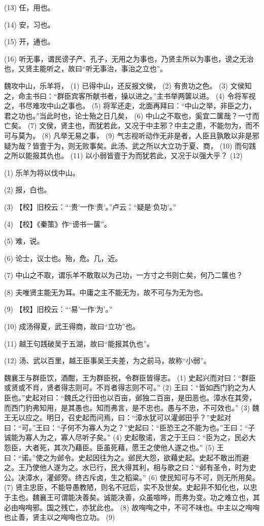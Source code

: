 \documentclass[12pt,UTF8]{ctexbook}
\begin{document}
(13) 任，用也。

(14) 安，习也。

(15) 开，通也。

(16) 听无事，谓民谤子产、孔子，无用之为事也，乃贤主所以为事也，谤之无治也，又贤主能听之，故曰“听无事治，事治之立也”。

魏攻中山，乐羊将， (1) 已得中山，还反报文侯， (2) 有贵功之色。 (3) 文侯知之，命主书曰：“群臣宾客所献书者，操以进之。”主书举两箧以进。 (4) 令将军视之，书尽难攻中山之事也。 (5) 将军还走，北面再拜曰：“中山之举，非臣之力，君之功也。”当此时也，论士殆之日几矣， (6) 中山之不取也，奚宜二箧哉？一寸而亡矣。 (7) 文侯，贤主也，而犹若此，又况于中主邪？中主之患，不能勿为，而不可与莫为。 (8) 凡举无易之事， (9) 气志视听动作无非是者，人臣且孰敢以非是邪疑为哉？皆壹于为，则无败事矣。此汤、武之所以大立功于夏、商， (10) 而句践之所以能报其仇也。 (11) 以小弱皆壹于为而犹若此，又况于以强大乎？ (12)

(1) 乐羊为将以伐中山。

(2) 报，白也。

(3) 【校】旧校云：“‘贵’一作‘责’。”卢云：“疑是‘负功’。”

(4) 【校】《秦策》作“谤书一箧”。

(5) 难，说。

(6) 论士，议士也。殆，危。几，近。

(7) 中山之不取，谓乐羊不敢取以为己功，一方寸之书则亡矣，何乃二箧也？

(8) 夫唯贤主能无为耳。中庸之主不能无为，故不可与为无为也。

(9) 【校】旧校云：“‘易’一作‘为’。”

(10) 成汤得夏，武王得商，故曰“立功”也。

(11) 越王句践破吴于五湖，故曰“能报其仇也”。

(12) 汤、武以百里，越王臣事吴王夫差，为之前马，故称“小弱”。

魏襄王与群臣饮，酒酣，王为群臣祝，令群臣皆得志。 (1) 史起兴而对曰：“群臣或贤或不肖，贤者得志则可。不肖者得志则不可。” (2) 王曰：“皆如西门豹之为人臣也。”史起对曰：“魏氏之行田也以百亩，邺独二百亩，是田恶也。漳水在其旁，而西门豹弗知用，是其愚也。知而弗言，是不忠也。愚与不忠，不可效也。” (3) 魏王无以应之。明日，召史起而问焉，曰：“漳水犹可以灌邺田乎？”史起对曰：“可。”王曰：“子何不为寡人为之？”史起曰：“臣恐王之不能为也。”王曰：“子诚能为寡人为之，寡人尽听子矣。” (4) 史起敬诺，言之于王曰：“臣为之，民必大怨臣，大者死，其次乃藉臣。臣虽死藉，愿王之使他人遂之也。” (5) 王曰：“诺。”使之为邺令。史起因往为之。邺民大怨，欲藉史起。史起不敢出而避之。王乃使他人遂为之。水已行，民大得其利，相与歌之曰：“邺有圣令，时为史公。决漳水，灌邺旁。终古斥卤，生之稻粱。” (6) 使民知可与不可，则无所用矣。 (7) 贤主忠臣，不能导愚教陋，则名不冠后，实不及世矣。史起非不知化也，以忠于主也。魏襄王可谓能决善矣。诚能决善，众虽喧哗，而弗为变。功之难立也，其必由哅哅邪。国之残亡，亦犹此也。 (8) 故哅哅之中，不可不味也。中主以之哅哅也止善，贤主以之哅哅也立功。 (9)
\end{document}
